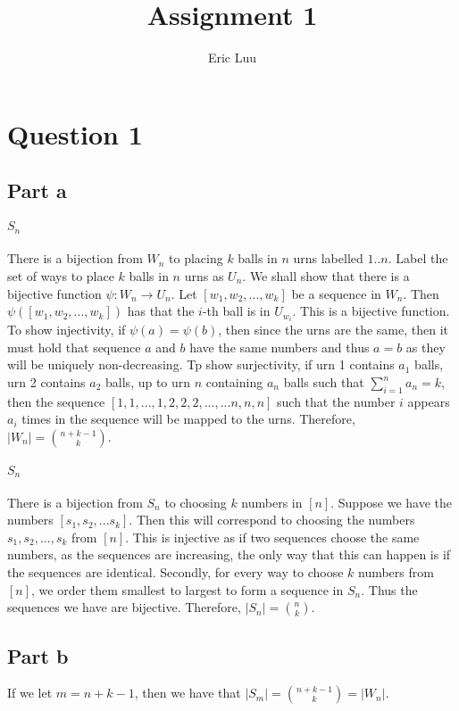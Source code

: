 \documentclass[]{article}
\title{Assignment 1}
\author{Eric Luu}
\begin{document}
\maketitle
\section{Question 1}
\subsection{Part a}
\paragraph{$S_n$}
There is a bijection from $W_n$ to placing $k$ balls in $n$ urns labelled $1 .. n$. Label the set of ways to place $k$ balls in $n$ urns as $U_n$. We shall show that there is a bijective function $\psi: W_n \rightarrow U_n$. Let $[w_1, w_2, ..., w_{k}]$ be a sequence in $W_n$. Then  $\psi([w_1, w_2, ..., w_{k}])$ has that the $i$-th ball is in $U_{w_i}$. This is a bijective function. To show injectivity, if $\psi(a) = \psi(b)$, then since the urns are the same, then it must hold that sequence $a$ and $b$ have the same numbers and thus $a = b$ as they will be uniquely non-decreasing. Tp show surjectivity, if urn 1 contains $a_1$ balls, urn 2 contains $a_2$ balls, up to urn $n$ containing $a_n$ balls such that $\sum_{i = 1}^n a_n = k$, then the sequence $[1, 1, ..., 1, 2, 2, 2, ..., ... n, n, n]$ such that the number $i$ appears $a_i$ times in the sequence will be mapped to the urns. 
Therefore, $|W_n| = \binom{n + k - 1}{k}$. 
\paragraph{$S_n$}
There is a bijection from $S_n$ to choosing $k$ numbers in $[n]$. Suppose we have the numbers $[s_1, s_2, ... s_k]$. Then this will correspond to choosing the numbers $s_1, s_2, ..., s_k$ from $[n]$. This is injective as if two sequences choose the same numbers, as the sequences are increasing, the only way that this can happen is if the sequences are identical. Secondly, for every way to choose $k$ numbers from $[n]$, we order them smallest to largest to form a sequence in $S_n$. Thus the sequences we have are bijective.
Therefore, $|S_n| = \binom{n}{k}$. 
\subsection{Part b}
If we let $m = n + k - 1$, then we have that $|S_m| = \binom{n + k - 1}{k} = |W_n|$. 
\end{document}

